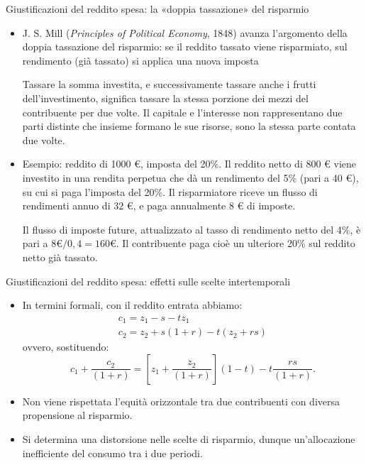 \documentclass[aspectratio=64,11pt]{beamer}
\newcommand\€{\,\text{€}}
\begin{document}
\begin{frame}{Giustificazioni del reddito spesa: la «doppia tassazione» del risparmio}
\begin{itemize}
\item J. S. Mill (\emph{Principles of Political Economy}, 1848) avanza l'argomento della \alert{doppia tassazione del risparmio}: se il reddito tassato viene risparmiato, sul rendimento (già tassato) si applica una nuova imposta
\begin{quoting}\small
Tassare la somma investita, e successivamente tassare anche i frutti dell'investimento, significa tassare la stessa porzione dei mezzi del contribuente per due volte. Il capitale e l'interesse non rappresentano due parti distinte che insieme formano le sue risorse, sono la stessa parte contata due volte.
\end{quoting}
\item Esempio: reddito di 1000 €, imposta del 20\%. Il reddito netto di 800 € viene
investito in una rendita perpetua che dà un rendimento del 5\% (pari a 40 €),
su cui si paga l'imposta del 20\%.  Il risparmiatore riceve un flusso di
rendimenti annuo di 32 €, e paga annualmente 8 € di imposte.

Il flusso di imposte future, attualizzato al tasso di rendimento netto del
4\%, è pari a $8€/0,4=160 €$. Il contribuente paga cioè un ulteriore 20\% sul reddito
netto già tassato.
\end{itemize}
\end{frame}

\begin{frame}{Giustificazioni del reddito spesa: effetti sulle scelte intertemporali}

\begin{itemize}
\item In termini formali, con il reddito entrata abbiamo:  
\begin{gather*}
  c_1=z_1-s-tz_1\\
  c_2=z_2+s(1+r) -t(z_2 +rs)
\end{gather*}
ovvero, sostituendo:
\begin{equation*}
c_1+\frac{c_2}{(1+r)}=
\left[z_1+\frac{z_2}{(1+r)}\right](1-t)-t\frac{rs}{(1+r)}.
\end{equation*}
\item Non viene rispettata l'equità orizzontale tra due contribuenti con diversa
propensione al risparmio.
\item Si determina una distorsione nelle scelte di risparmio, dunque un'allocazione inefficiente del consumo tra i due periodi.
\end{itemize}
\end{frame}
\end{document}
